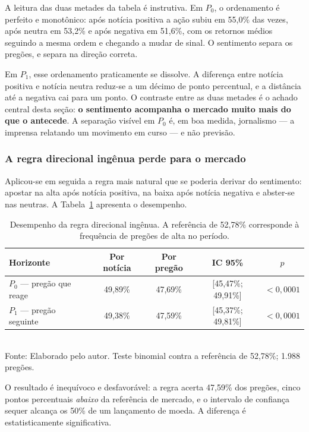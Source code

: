 A leitura das duas metades da tabela é instrutiva. Em $P_0$, o ordenamento é perfeito e monotônico:
após notícia positiva a ação subiu em 55,0\% das vezes, após neutra em 53,2\% e após negativa em
51,6\%, com os retornos médios seguindo a mesma ordem e chegando a mudar de sinal. O sentimento
separa os pregões, e separa na direção correta.

Em $P_1$, esse ordenamento praticamente se dissolve. A diferença entre notícia positiva e notícia
neutra reduz-se a um décimo de ponto percentual, e a distância até a negativa cai para um ponto.
O contraste entre as duas metades é o achado central desta seção: \textbf{o sentimento acompanha o
mercado muito mais do que o antecede}. A separação visível em $P_0$ é, em boa medida, jornalismo ---
a imprensa relatando um movimento em curso --- e não previsão.

\subsubsection{A regra direcional ingênua perde para o mercado}

Aplicou-se em seguida a regra mais natural que se poderia derivar do sentimento: apostar na alta
após notícia positiva, na baixa após notícia negativa e abster-se nas neutras. A
Tabela~\ref{tab:auditoria_regra} apresenta o desempenho.

\begin{table}[htpb]
\centering
\caption{Desempenho da regra direcional ingênua. A referência de 52,78\% corresponde à frequência de pregões de alta no período.}
\label{tab:auditoria_regra}
\begin{tabular}{l c c c c}
\hline
\textbf{Horizonte} & \textbf{Por notícia} & \textbf{Por pregão} & \textbf{IC 95\%} & \textbf{$p$} \\ \hline
$P_0$ --- pregão que reage & 49,89\% & 47,69\% & [45,47\%; 49,91\%] & $<0{,}0001$ \\
$P_1$ --- pregão seguinte  & 49,38\% & 47,59\% & [45,37\%; 49,81\%] & $<0{,}0001$ \\
\hline
\end{tabular}
\vspace{0.2cm}
{\small \\ Fonte: Elaborado pelo autor. Teste binomial contra a referência de 52,78\%; 1.988 pregões.}
\end{table}

O resultado é inequívoco e desfavorável: a regra acerta 47,59\% dos pregões, cinco pontos percentuais
\emph{abaixo} da referência de mercado, e o intervalo de confiança sequer alcança os 50\% de um
lançamento de moeda. A diferença é estatisticamente significativa.

